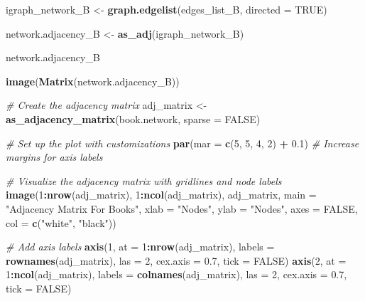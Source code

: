 \documentclass[
]{article}
\newenvironment{Shaded}{\begin{snugshade}}{\end{snugshade}}
\newcommand{\AttributeTok}[1]{\textcolor[rgb]{0.13,0.29,0.53}{#1}}
\newcommand{\CommentTok}[1]{\textcolor[rgb]{0.56,0.35,0.01}{\textit{#1}}}
\newcommand{\ConstantTok}[1]{\textcolor[rgb]{0.56,0.35,0.01}{#1}}
\newcommand{\DecValTok}[1]{\textcolor[rgb]{0.00,0.00,0.81}{#1}}
\newcommand{\FloatTok}[1]{\textcolor[rgb]{0.00,0.00,0.81}{#1}}
\newcommand{\FunctionTok}[1]{\textcolor[rgb]{0.13,0.29,0.53}{\textbf{#1}}}
\newcommand{\NormalTok}[1]{#1}
\newcommand{\OtherTok}[1]{\textcolor[rgb]{0.56,0.35,0.01}{#1}}
\newcommand{\SpecialCharTok}[1]{\textcolor[rgb]{0.81,0.36,0.00}{\textbf{#1}}}
\newcommand{\StringTok}[1]{\textcolor[rgb]{0.31,0.60,0.02}{#1}}
\begin{document}
\begin{Shaded}
\begin{Highlighting}[]
\NormalTok{igraph\_network\_B }\OtherTok{\textless{}{-}} \FunctionTok{graph.edgelist}\NormalTok{(edges\_list\_B, }\AttributeTok{directed =} \ConstantTok{TRUE}\NormalTok{)}

\NormalTok{network.adjacency\_B }\OtherTok{\textless{}{-}} \FunctionTok{as\_adj}\NormalTok{(igraph\_network\_B)}

\NormalTok{network.adjacency\_B}

\FunctionTok{image}\NormalTok{(}\FunctionTok{Matrix}\NormalTok{(network.adjacency\_B))}

\CommentTok{\# Create the adjacency matrix}
\NormalTok{adj\_matrix }\OtherTok{\textless{}{-}} \FunctionTok{as\_adjacency\_matrix}\NormalTok{(book.network, }\AttributeTok{sparse =} \ConstantTok{FALSE}\NormalTok{)}

\CommentTok{\# Set up the plot with customizations}
\FunctionTok{par}\NormalTok{(}\AttributeTok{mar =} \FunctionTok{c}\NormalTok{(}\DecValTok{5}\NormalTok{, }\DecValTok{5}\NormalTok{, }\DecValTok{4}\NormalTok{, }\DecValTok{2}\NormalTok{) }\SpecialCharTok{+} \FloatTok{0.1}\NormalTok{)  }\CommentTok{\# Increase margins for axis labels}

\CommentTok{\# Visualize the adjacency matrix with gridlines and node labels}
\FunctionTok{image}\NormalTok{(}\DecValTok{1}\SpecialCharTok{:}\FunctionTok{nrow}\NormalTok{(adj\_matrix), }\DecValTok{1}\SpecialCharTok{:}\FunctionTok{ncol}\NormalTok{(adj\_matrix), adj\_matrix, }
      \AttributeTok{main =} \StringTok{"Adjacency Matrix For Books"}\NormalTok{, }
      \AttributeTok{xlab =} \StringTok{"Nodes"}\NormalTok{, }\AttributeTok{ylab =} \StringTok{"Nodes"}\NormalTok{, }
      \AttributeTok{axes =} \ConstantTok{FALSE}\NormalTok{, }\AttributeTok{col =} \FunctionTok{c}\NormalTok{(}\StringTok{"white"}\NormalTok{, }\StringTok{"black"}\NormalTok{))}


\CommentTok{\# Add axis labels}
\FunctionTok{axis}\NormalTok{(}\DecValTok{1}\NormalTok{, }\AttributeTok{at =} \DecValTok{1}\SpecialCharTok{:}\FunctionTok{nrow}\NormalTok{(adj\_matrix), }\AttributeTok{labels =} \FunctionTok{rownames}\NormalTok{(adj\_matrix), }\AttributeTok{las =} \DecValTok{2}\NormalTok{, }\AttributeTok{cex.axis =} \FloatTok{0.7}\NormalTok{, }\AttributeTok{tick =} \ConstantTok{FALSE}\NormalTok{)}
\FunctionTok{axis}\NormalTok{(}\DecValTok{2}\NormalTok{, }\AttributeTok{at =} \DecValTok{1}\SpecialCharTok{:}\FunctionTok{ncol}\NormalTok{(adj\_matrix), }\AttributeTok{labels =} \FunctionTok{colnames}\NormalTok{(adj\_matrix), }\AttributeTok{las =} \DecValTok{2}\NormalTok{, }\AttributeTok{cex.axis =} \FloatTok{0.7}\NormalTok{, }\AttributeTok{tick =} \ConstantTok{FALSE}\NormalTok{)}


\end{Highlighting}
\end{Shaded}
\end{document}

